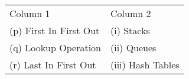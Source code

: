 \begin{center}
\begin{tabular}{ll}
Column 1 & Column 2 \\
(p) First In First Out & (i) Stacks \\
(q) Lookup Operation & (ii) Queues \\
(r) Last In First Out & (iii) Hash Tables \\
\end{tabular}
\end{center}